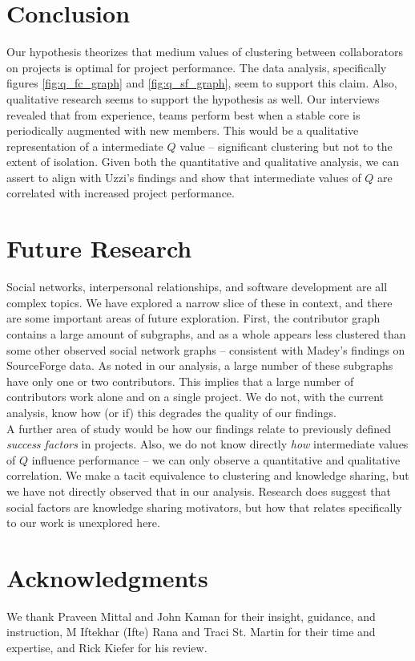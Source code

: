 \documentclass{proc}
\begin{document}
\section{Conclusion}
Our hypothesis theorizes that medium values of clustering between collaborators on projects is optimal for project performance. The data analysis, specifically figures \ref{fig:q_fc_graph} and \ref{fig:q_sf_graph}, seem to support this claim. Also, qualitative research seems to support the hypothesis as well. Our interviews revealed that from experience, teams perform best when a stable core is periodically augmented with new members. This would be a qualitative representation of a intermediate $Q$ value -- significant clustering but not to the extent of isolation. Given both the quantitative and qualitative analysis, we can assert to align with Uzzi's findings\cite{uzzi2005collaboration} and show that intermediate values of $Q$ are correlated with increased project performance.

\section{Future Research}
Social networks, interpersonal relationships, and software development are all complex topics. We have explored a narrow slice of these in context, and there are some important areas of future exploration. First, the contributor graph contains a large amount of subgraphs, and as a whole appears less clustered than some other observed social network graphs -- consistent with Madey's findings\cite{madey2002open} on SourceForge data. As noted in our analysis, a large number of these subgraphs have only one or two contributors. This implies that a large number of contributors work alone and on a single project. We do not, with the current analysis, know how (or if) this degrades the quality of our findings.\\

A further area of study would be how our findings relate to previously defined \textit{success factors} in projects\cite{cooke2002real}. Also, we do not know directly \textit{how} intermediate values of $Q$ influence performance -- we can only observe a quantitative and qualitative correlation. We make a tacit equivalence to clustering and knowledge sharing, but we have not directly observed that in our analysis. Research does suggest that social factors are knowledge sharing motivators\cite{hendriks1999share}, but how that relates specifically to our work is unexplored here.\\

\section{Acknowledgments}
We thank Praveen Mittal and John Kaman for their insight, guidance, and instruction, M Iftekhar (Ifte) Rana and Traci St. Martin for their time and expertise, and Rick Kiefer for his review.






\end{document}
